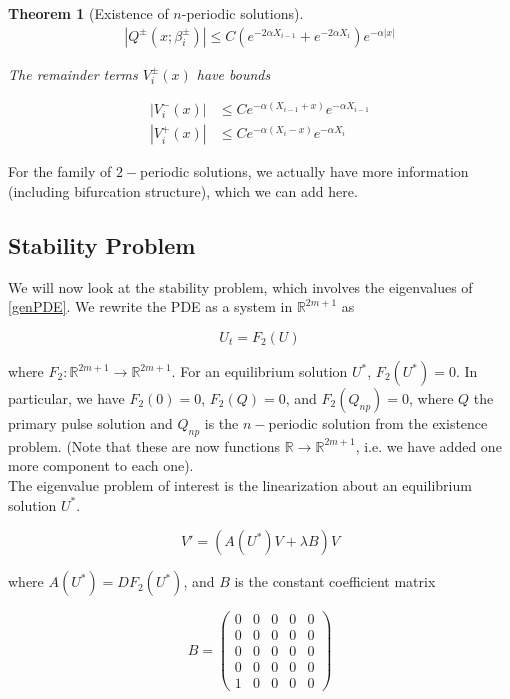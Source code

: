 \documentclass[12pt]{article}
\def\R{{\mathbb R}}
\newtheorem{theorem}{Theorem}
\begin{document}
\begin{theorem}[Existence of $n$-periodic solutions]
\begin{align*}
|Q^\pm(x; \beta_i^\pm)| \leq C (e^{-2 \alpha X_{i-1}} + e^{-2 \alpha X_i})e^{-\alpha |x|}
\end{align*} 

The remainder terms $V_i^\pm(x)$ have bounds

\begin{align}
|V_i^-(x)| &\leq C e^{-\alpha(X_{i-1} + x)}e^{-\alpha X_{i-1}} \\
|V_i^+(x)| &\leq C e^{-\alpha(X_i - x)}e^{-\alpha X_i} 
\end{align} 
\end{theorem}

For the family of $2-$periodic solutions, we actually have more information (including bifurcation structure), which we can add here.

\subsection{Stability Problem}

We will now look at the stability problem, which involves the eigenvalues of \eqref{genPDE}. We rewrite the PDE as a system in $\R^{2m+1}$ as

\begin{equation}\label{PDEsystem}
U_t = F_2(U)
\end{equation}

where $F_2: \R^{2m+1} \rightarrow \R^{2m+1}$. For an equilibrium solution $U^*$, $F_2(U^*) = 0$. In particular, we have $F_2(0) = 0$, $F_2(Q) = 0$, and $F_2(Q_{np}) = 0$, where $Q$ the primary pulse solution and $Q_{np}$ is the $n-$periodic solution from the existence problem. (Note that these are now functions $\R \rightarrow \R^{2m+1}$, i.e. we have added one more component to each one).
\\

The eigenvalue problem of interest is the linearization about an equilibrium solution $U^*$.

\begin{equation}\label{PDEeig}
V' = ( A(U^*)V + \lambda B)V 
\end{equation}

where $A(U^*) = DF_2(U^*)$, and $B$ is the constant coefficient matrix

\begin{equation}\label{DefB}
B = \begin{pmatrix}0 & 0 & 0 & 0 & 0 \\0 & 0 & 0 & 0 & 0 \\0  & 0 & 0 & 0 & 0 \\0 & 0 & 0 & 0 & 0 \\1 & 0 & 0 & 0 & 0 \end{pmatrix} 
\end{equation}
\end{document}
